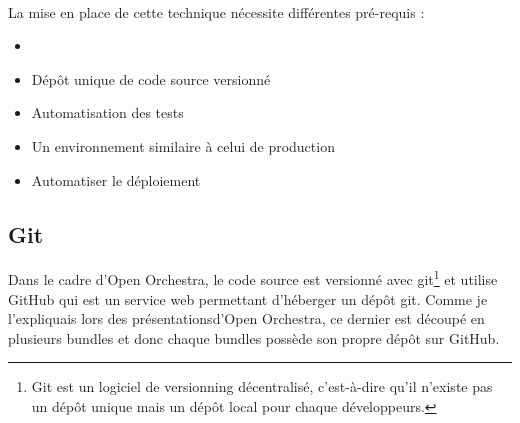 \paragraph{}
La mise en place de cette technique nécessite différentes pré-requis : 
\begin{itemize}
\item[]
\item Dépôt unique de code source versionné
\item Automatisation des tests
\item Un environnement similaire à celui de production
\item Automatiser le déploiement
\end{itemize}

\subsection{Git}
Dans le cadre d'Open Orchestra, le code source est versionné avec git\footnote{Git est un logiciel de versionning décentralisé, c'est-à-dire qu'il n'existe pas un dépôt unique mais un dépôt local pour chaque développeurs.} et utilise GitHub qui est un service web permettant d'héberger un dépôt git. Comme je l'expliquais lors des présentationsd'Open Orchestra, ce dernier est découpé en plusieurs bundles et donc chaque bundles possède son propre dépôt sur GitHub.
